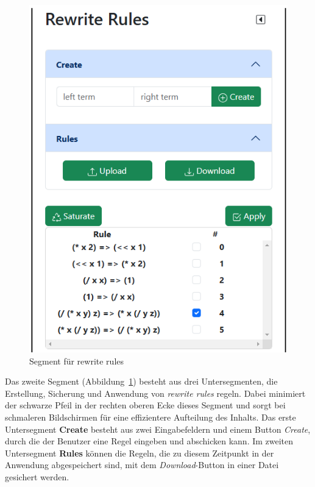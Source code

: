 \begin{figure}
    \vspace{-10mm}
    \begin{center}
      \includegraphics[scale=0.6]{../fig/rewriterulecontrol.png}
    \end{center}
    \caption{Segment für rewrite rules}
    \label{fig:segment2}
\end{figure}

Das zweite Segment (Abbildung~\ref{fig:segment2}) besteht aus drei Untersegmenten, die Erstellung, Sicherung und Anwendung von \textit{rewrite rules} regeln. 
Dabei minimiert der schwarze Pfeil in der rechten oberen Ecke dieses Segment und sorgt bei schmaleren Bildschirmen für eine effizientere Aufteilung des Inhalts.
Das erste Untersegment \textbf{Create} besteht aus zwei Eingabefeldern und einem Button \textit{Create}, durch die der Benutzer eine Regel eingeben und abschicken kann.
Im zweiten Untersegment \textbf{Rules} können die Regeln, die zu diesem Zeitpunkt in der Anwendung abgespeichert sind, mit dem \textit{Download}-Button in einer Datei gesichert werden.

